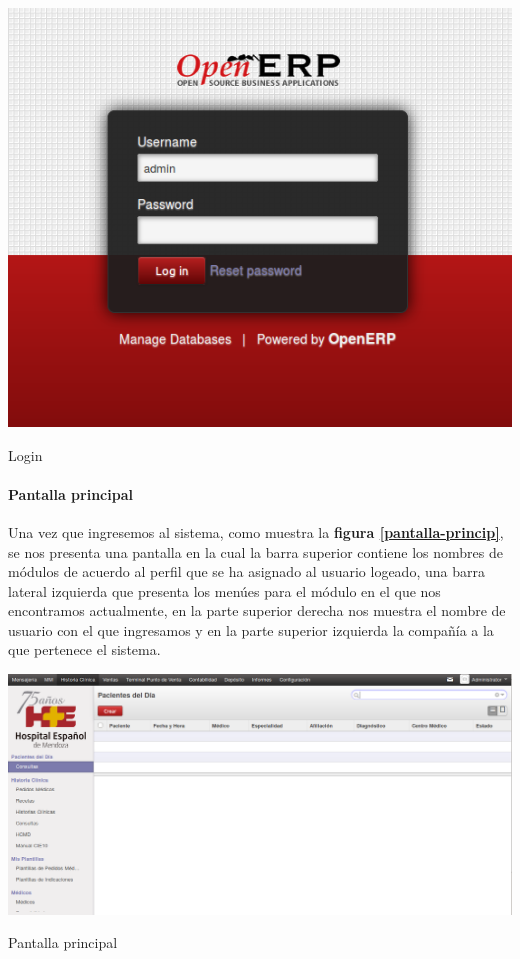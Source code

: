 \begin{correccionFigure}[h]
      \centering
      \includegraphics[width=.8\textwidth]{img/tp1/HE/Login}
      \caption{Login}
      \label{login-sistema}
\end{correccionFigure} 


\paragraph{Pantalla principal}

Una vez que ingresemos al sistema, como muestra la \textbf{figura \ref{pantalla-princip}}, se nos presenta una pantalla en la cual la barra superior contiene los nombres de módulos de acuerdo al perfil que se ha asignado al usuario logeado, una barra lateral izquierda que presenta los menúes para el módulo en el que nos encontramos actualmente, en la parte superior derecha nos muestra el nombre de usuario con el que ingresamos y en la parte superior izquierda la compañía a la que pertenece el sistema.


\begin{correccionFigure}[h]
      \centering
      \includegraphics[width=.8\textwidth]{img/tp1/HE/PantallaPrincip}
      \caption{Pantalla principal}
      \label{pantalla-princip}
\end{correccionFigure}



